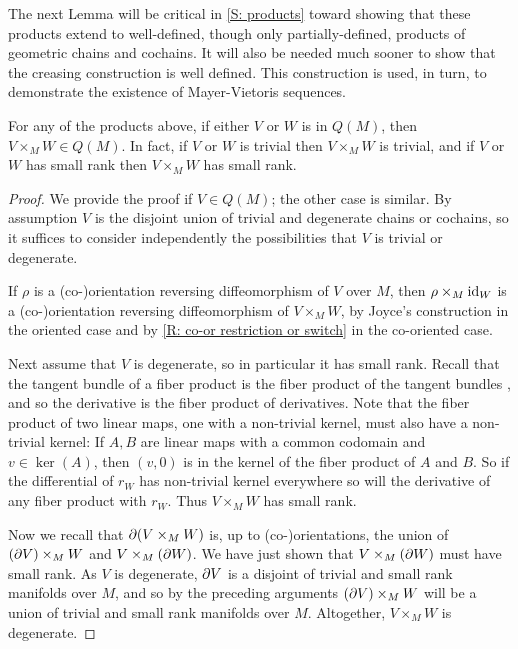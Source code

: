 The next Lemma will be critical in \cref{S: products} toward showing that these products extend to well-defined, though only partially-defined, products of geometric chains and cochains. It will also be needed much sooner to show that the creasing construction is well defined. This construction is used, in turn, to demonstrate the existence of Mayer-Vietoris sequences.

\begin{lemma}\label{L: pullback with Q}
For any of the products above, if either $V$ or $W$ is in $Q(M)$, then $V \times_M W \in Q(M)$. In fact, if $V$ or $W$ is trivial then $V \times_M W$ is trivial, and if $V$ or $W$ has small rank then $V \times_M W$ has small rank.
\end{lemma}
\begin{proof}
We provide the proof if $V \in Q(M)$; the other case is similar. By assumption $V$ is the disjoint union of trivial and degenerate chains or cochains, so it suffices to consider independently the possibilities that $V$ is trivial or degenerate.

If $\rho$ is a (co-)orientation reversing diffeomorphism of $V$ over $M$, then $\rho \times_M \mathrm{id}_W$ is a (co-)orientation reversing diffeomorphism of $V \times_M W$, by Joyce's construction in the oriented case and by \cref{R: co-or restriction or switch} in the co-oriented case.

Next assume that $V$ is degenerate, so in particular it has small rank. Recall that the tangent bundle of a fiber product is the fiber product of the tangent bundles \cite[Theorem 5.47]{Wed16}, and so the derivative is the fiber product of derivatives.
Note that the fiber product of two linear maps, one with a non-trivial kernel, must also have a non-trivial kernel: If $A,B$ are linear maps with a common codomain and $v \in \ker(A)$, then $(v,0)$ is in the kernel of the fiber product of $A$ and $B$.
So if the differential of $r_W$ has non-trivial kernel everywhere so will the derivative of any fiber product with $r_W$. Thus $V \times_M W$ has small rank.

Now we recall that $\partial(V \times_M W)$ is, up to (co-)orientations, the union of $(\partial V) \times_M W$ and $V \times_M (\partial W)$. We have just shown that $V \times_M (\partial W)$ must have small rank. As $V$ is degenerate, $\partial V$ is a disjoint of trivial and small rank manifolds over $M$, and so by the preceding arguments $(\partial V) \times_M W$ will be a union of trivial and small rank manifolds over $M$. Altogether, $V \times_M W$ is degenerate.
\end{proof}


